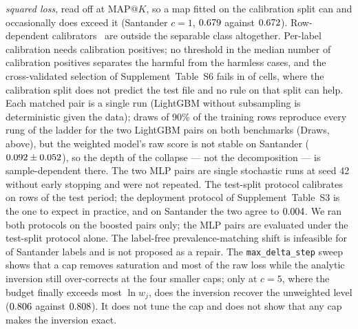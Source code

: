 \documentclass[sigconf,nonacm]{acmart}
\makeatletter
\newcommand{\mapk}{\mathrm{MAP}@K\xspace}
\newcommand{\Supp}[1]{Supplement~#1}  %
\makeatother
\begin{document}
\emph{squared loss}, read off at $\mapk$, so a map fitted on the calibration split can and occasionally does exceed it (Santander $c{=}1$, $0.679$ against $0.672$). Row-dependent calibrators~\cite{Rahimi2020IntraOrder} are outside the separable class altogether. Per-label calibration needs calibration positives; no threshold in the median number of calibration positives separates the harmful from the harmless cases, and the cross-validated selection of \Supp{Table~S6} fails in \nnTauSelBelowRaw{} of \nnTauCells{} cells, where the calibration split does not predict the test file and no rule on that split can help. Each matched pair is a single run (LightGBM without subsampling is deterministic given the data); \nseedN{} draws of 90\% of the training rows reproduce every rung of the ladder for the two LightGBM pairs on both benchmarks (Draws, above), but the weighted model's raw score is not stable on Santander ($0.092 \pm 0.052$), so the depth of the collapse --- not the decomposition --- is sample-dependent there. The two MLP pairs are single stochastic runs at seed 42 without early stopping and were not repeated.
The test-split protocol calibrates on rows of the test period; the deployment protocol of \Supp{Table~S3} is the one to expect in practice, and on Santander the two agree to $0.004$. We ran both protocols on the boosted pairs only; the MLP pairs are evaluated under the test-split protocol alone. The label-free prevalence-matching shift is infeasible for \nnCappedShift{} of \nnLabels{} Santander labels and is not proposed as a repair. The \texttt{max\_delta\_step} sweep shows that a cap removes saturation and most of the raw loss while the analytic inversion still over-corrects at the four smaller caps; only at $c{=}5$, where the budget finally exceeds most $\ln w_j$, does the inversion recover the unweighted level ($0.806$ against $0.808$). It does not tune the cap and does not show that any cap makes the inversion exact.
\end{document}
